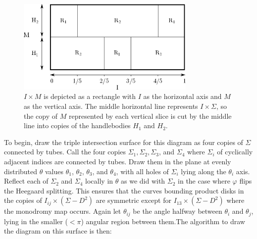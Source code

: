 \documentclass[12pt]{amsart}
\theoremstyle{definition}
\theoremstyle{remark}
\begin{document}
\begin{figure}[h]
\centering
\includegraphics[height=1.8in]{MxS1_unbalanced.png}
\caption{$I \times M$ is depicted as a rectangle with $I$ as the horizontal axis and $M$ as the vertical axis.  The middle horizontal line represents $I \times \Sigma$, so the copy of $M$ represented by each vertical slice is cut by the middle line into copies of the handlebodies $H_1$ and $H_2$.}
\label{unbalancedbreakdown}
\end{figure}

To begin, draw the triple intersection surface for this diagram as four copies of $\Sigma$ connected by tubes.  Call the four copies $\Sigma_1, \Sigma_2, \Sigma_3$, and $\Sigma_4$ where $\Sigma_i$ of cyclically adjacent indices are connected by tubes.  Draw them in the plane at evenly distributed $\theta$ values $\theta_1$, $\theta_2$, $\theta_3$, and $\theta_4$, with all holes of $\Sigma_i$ lying along the $\theta_i$ axis.  Reflect each of $\Sigma_2$ and $\Sigma_4$ locally in $\theta$ as we did with $\Sigma_2$ in the case where $\varphi$ flips the Heegaard splitting.  This ensures that the curves bounding product disks in the copies of $I_{ij} \times (\Sigma - D^2)$ are symmetric except for $I_{13} \times (\Sigma - D^2)$ where the monodromy map occurs.  Again let $\theta_{ij}$ be the angle halfway between $\theta_i$ and $\theta_j$, lying in the smaller ($< \pi$) angular region between them.The algorithm to draw the diagram on this surface is then:
\end{document}
